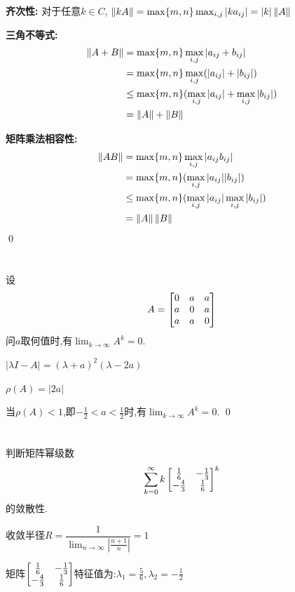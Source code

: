 \documentclass{matrix-homework}
\begin{document}
\textbf{齐次性:} 对于任意$k\in C$, $\left\lVert kA \right\rVert= \max\{m,n\}\max_{i,j}|ka_{ij}|= |k|\left\lVert A \right\rVert$

\textbf{三角不等式:}
\begin{align*}
    \left\lVert A+B \right\rVert & =\max\{m,n\}\max_{i,j}|a_{ij}+b_{ij}|                  \\
               & =   \max\{m,n\}\max_{i,j}(|a_{ij}|+|b_{ij}|)           \\
               & \le \max\{m,n\}(\max_{i,j}|a_{ij}|+\max_{i,j}|b_{ij}|) \\
               & = \left\lVert A \right\rVert+\left\lVert B \right\rVert
\end{align*}

\textbf{矩阵乘法相容性:}
\begin{align*}
    \left\lVert AB \right\rVert & =\max\{m,n\}\max_{i,j}|a_{ij}b_{ij}|                  \\
              & = \max\{m,n\}(\max_{i,j}|a_{ij}||b_{ij}|)             \\
              & \le \max\{m,n\}(\max_{i,j}|a_{ij}|\max_{i,j}|b_{ij}|) \\
              & = \left\lVert A \right\rVert\left\lVert B \right\rVert
\end{align*}
\qed

\newpage
\section{}
设$$A=\begin{bmatrix}0 & a & a \\ a & 0 & a \\ a & a & 0\end{bmatrix}$$问$a$取何值时,有$\lim_{k\to\infty}A^k=0$.

\answer
$|\lambda I-A| = (\lambda+a)^2(\lambda-2a)$

$\rho(A)=|2a|$

当$\rho(A)<1$,即$-\frac{1}{2}<a<\frac{1}{2}$时,有$\lim_{k\to\infty}A^k=0$.
\qed


\section{}
判断矩阵幂级数
\begin{align*}
    \sum_{k=0}^{\infty}k\begin{bmatrix}\frac{1}{6} & -\frac{1}{3} \\ -\frac{4}{3} & \frac{1}{6}\end{bmatrix}^k
\end{align*}
的敛散性.

\answer
收敛半径$R = \dfrac{1}{\lim_{n\to\infty}\left|\frac{n+1}{n}\right|}=1$

矩阵$\begin{bmatrix}\frac{1}{6} & -\frac{1}{3} \\ -\frac{4}{3} & \frac{1}{6}\end{bmatrix}$特征值为:$\lambda_1=\frac{5}{6},\lambda_2=-\frac{1}{2}$
\end{document}

